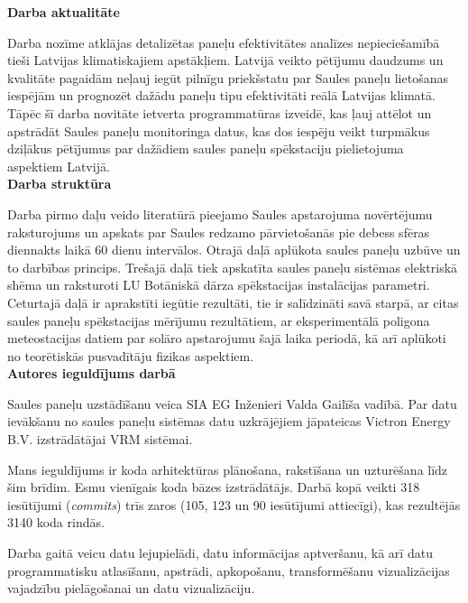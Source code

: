 \textbf{Darba aktualitāte}

Darba nozīme atklājas detalizētas paneļu efektivitātes analīzes nepieciešamībā tieši Latvijas klimatiskajiem apstākļiem. Latvijā veikto pētījumu daudzums un kvalitāte pagaidām neļauj iegūt pilnīgu priekšstatu par Saules paneļu lietošanas iespējām un prognozēt dažādu paneļu tipu efektivitāti reālā Latvijas klimatā. Tāpēc šī darba novitāte ietverta programmatūras izveidē, kas ļauj attēlot un apstrādāt Saules paneļu monitoringa datus, kas dos iespēju veikt turpmākus dziļākus pētījumus par dažādiem saules paneļu spēkstaciju pielietojuma aspektiem Latvijā.\\

\textbf{Darba struktūra}

Darba pirmo daļu veido literatūrā pieejamo Saules apstarojuma novērtējumu raksturojums un apskats par Saules redzamo pārvietošanās pie debess sfēras diennakts laikā 60 dienu intervālos. Otrajā daļā aplūkota saules paneļu uzbūve un to darbības princips. Trešajā daļā tiek apskatīta saules paneļu sistēmas elektriskā shēma un raksturoti LU Botāniskā dārza spēkstacijas instalācijas parametri.
Ceturtajā daļā ir aprakstīti iegūtie rezultāti, tie ir salīdzināti savā starpā, ar citas saules paneļu spēkstacijas mērījumu rezultātiem, ar eksperimentālā poligona meteostacijas datiem par solāro apstarojumu šajā laika periodā, kā arī aplūkoti no teorētiskās pusvadītāju fizikas aspektiem.\\

\textbf{Autores ieguldījums darbā}

Saules paneļu uzstādīšanu veica SIA EG Inženieri Valda Gailīša vadībā.
Par datu ievākšanu no saules paneļu sistēmas datu uzkrājējiem jāpateicas Victron Energy B.V. izstrādātājai VRM sistēmai.

Mans ieguldījums ir koda arhitektūras plānošana, rakstīšana un uzturēšana līdz šim brīdim. Esmu vienīgais koda bāzes izstrādātājs. Darbā kopā veikti 318 iesūtījumi (\textit{commits}) trīs zaros (105, 123 un 90 iesūtījumi attiecīgi), kas rezultējās 3140 koda rindās. 

Darba gaitā veicu datu lejupielādi, datu informācijas aptveršanu, kā arī datu programmatisku atlasīšanu, apstrādi, apkopošanu, transformēšanu vizualizācijas vajadzību pielāgošanai un datu vizualizāciju. 

